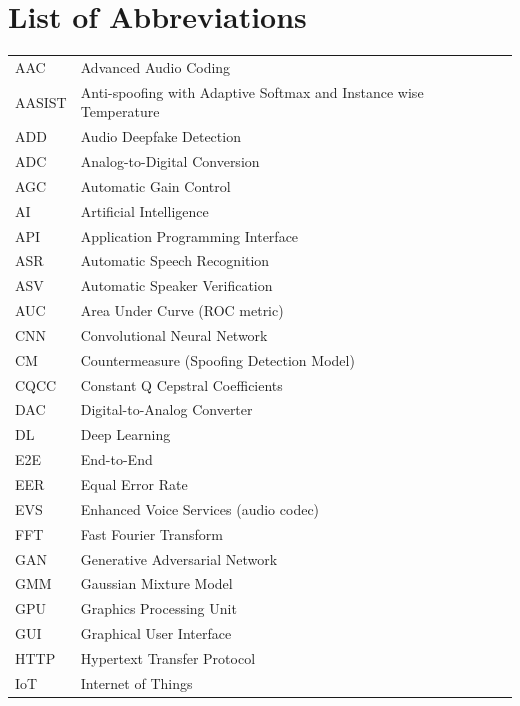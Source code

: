 \newpage
{}
\section*{List of Abbreviations}

\begin{longtable}{@{}p{5cm} p{11cm}}

AAC       & Advanced Audio Coding \\[0.2cm]
AASIST    & Anti-spoofing with Adaptive Softmax and Instance wise Temperature \\[0.2cm]
ADD       & Audio Deepfake Detection \\[0.2cm]
ADC       & Analog-to-Digital Conversion \\[0.2cm]
AGC       & Automatic Gain Control \\[0.2cm]
AI        & Artificial Intelligence \\[0.2cm]
API       & Application Programming Interface \\[0.2cm]
ASR       & Automatic Speech Recognition \\[0.2cm]
ASV       & Automatic Speaker Verification \\[0.2cm]
AUC       & Area Under Curve (ROC metric) \\[0.2cm]
CNN       & Convolutional Neural Network \\[0.2cm]
CM        & Countermeasure (Spoofing Detection Model) \\[0.2cm]
CQCC      & Constant Q Cepstral Coefficients \\[0.2cm]
DAC       & Digital-to-Analog Converter \\[0.2cm]
DL        & Deep Learning \\[0.2cm]
E2E       & End-to-End \\[0.2cm]
EER       & Equal Error Rate \\[0.2cm]
EVS       & Enhanced Voice Services (audio codec) \\[0.2cm]
FFT       & Fast Fourier Transform \\[0.2cm]
GAN       & Generative Adversarial Network \\[0.2cm]
GMM       & Gaussian Mixture Model \\[0.2cm]
GPU       & Graphics Processing Unit \\[0.2cm]
GUI       & Graphical User Interface \\[0.2cm]
HTTP      & Hypertext Transfer Protocol \\[0.2cm]
IoT       & Internet of Things \\[0.2cm]

\end{longtable}
